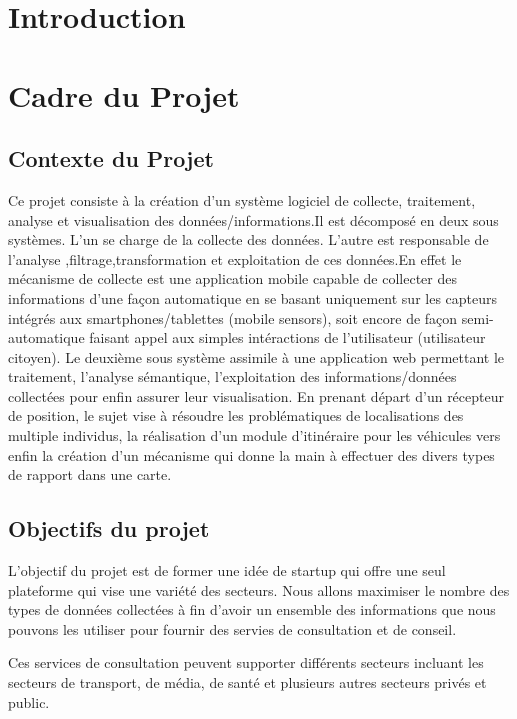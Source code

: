 \section*{Introduction}

\section{ Cadre du Projet}

\subsection{Contexte du Projet}
Ce projet consiste à la création d’un système logiciel de collecte, traitement,
analyse et visualisation des données/informations.Il est décomposé en deux sous systèmes.
L’un se charge de la collecte des données. L’autre est responsable de l'analyse ,filtrage,transformation
et exploitation de ces données.En effet le mécanisme de collecte est une application mobile capable 
de collecter des
informations d’une façon automatique en se basant uniquement sur les capteurs intégrés
aux smartphones/tablettes (mobile sensors), soit encore de
façon semi-automatique faisant appel aux simples intéractions de l’utilisateur
(utilisateur citoyen). Le deuxième sous système assimile à une application
web permettant le traitement, l’analyse sémantique, l'exploitation
des informations/données collectées pour enfin assurer leur visualisation.
En prenant départ d’un récepteur de position, le sujet vise à résoudre les
problématiques de localisations des multiple individus, la réalisation d’un
module d’itinéraire pour les véhicules vers enfin la création d’un mécanisme
qui donne la main à effectuer des divers types de rapport dans une carte.

\subsection{Objectifs du projet}

L'objectif du projet est de former une idée de startup qui offre une seul plateforme qui vise
une variété
des secteurs. Nous allons maximiser le nombre des types de données collectées à
fin d'avoir un ensemble des informations que nous pouvons les utiliser pour
fournir des servies de consultation et de conseil.

Ces services de consultation peuvent supporter différents secteurs incluant
les secteurs de transport, de média, de santé et plusieurs autres secteurs
privés et public.

